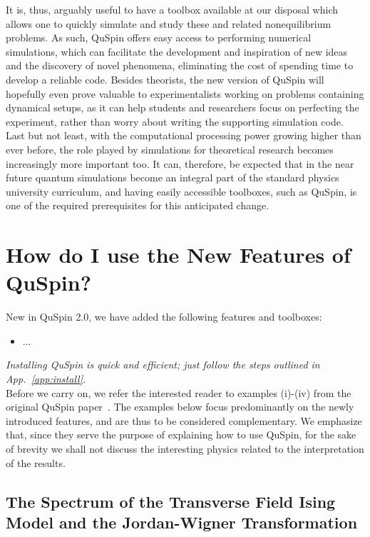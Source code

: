 \documentclass{SciPost}
\newcommand\0{\scalebox{-1}[1]{0}}
\begin{document}
It is, thus, arguably useful to have a toolbox available at our disposal which allows one to quickly simulate and study these and related nonequilibrium problems. As such, QuSpin offers easy access to performing numerical simulations, which can facilitate the development and inspiration of new ideas and the discovery of novel phenomena, eliminating the cost of spending time to develop a reliable code. Besides theorists, the new version of QuSpin will hopefully even prove valuable to experimentalists working on problems containing dynamical setups, as it can help students and researchers focus on perfecting the experiment, rather than worry about writing the supporting simulation code. Last but not least, with the computational processing power growing higher than ever before, the role played by simulations for theoretical research becomes increasingly more important too. It can, therefore, be expected that in the near future quantum simulations become an integral part of the standard physics university curriculum, and having easily accessible toolboxes, such as QuSpin, is one of the required prerequisites for this anticipated change.


\section{How do I use the New Features of QuSpin?}
\label{sec:examples}

New in QuSpin 2.0, we have added the following features and toolboxes:
\begin{itemize}
	\item ...
\end{itemize}

\emph{Installing QuSpin is quick and efficient; just follow the steps outlined in App.~\ref{app:install}.}\\

\noindent Before we carry on, we refer the interested reader to examples (i)-(iv) from the original QuSpin paper~\cite{weinberg_17_quspin}. The examples below focus predominantly on the newly introduced features, and are thus to be considered complementary. We emphasize that, since they serve the purpose of explaining how to use QuSpin, for the sake of brevity we shall not discuss the interesting physics related to the interpretation of the results.

\subsection{The Spectrum of the Transverse Field Ising Model and the Jordan-Wigner Transformation}
\label{subsec:JW}
\end{document}
